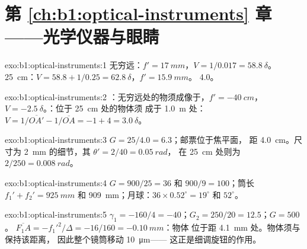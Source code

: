 \section*{第 \ref{ch:b1:optical-instruments} 章——光学仪器与眼睛}

\begin{solution}{exo:b1:optical-instruments:1}
无穷远：$f' = \qty{17}{mm}$，$V = 1/0.017 = \qty{58.8}{\delta}$。
\qty{25}{cm}：$V = 58.8 + 1/0.25 = \qty{62.8}{\delta}$，$f' = \qty{15.9}{mm}$。
 \qty{4.0}{\delta}。
\end{solution}

\begin{solution}{exo:b1:optical-instruments:2}
：无穷远处的物须成像于，$f' = \qty{-40}{cm}$，
$V = \qty{-2.5}{\delta}$。：位于 \qty{25}{cm} 处的物体须
成于 \qty{1.0}{m} 处：$V = 1/\overline{OA'} - 1/\overline{OA}
= -1 + 4 = \qty{+3.0}{\delta}$。
\end{solution}

\begin{solution}{exo:b1:optical-instruments:3}
$G = 25/4.0 = 6.3$；邮票位于焦平面，
距 \qty{4.0}{cm}。尺寸为 \qty{2}{mm} 的细节，其 $\theta' = 2/40 = \qty{0.05}{rad}$，
在 \qty{25}{cm} 处则为 $2/250 = \qty{0.008}{rad}$。
\end{solution}

\begin{solution}{exo:b1:optical-instruments:4}
$G = 900/25 = 36$ 和 $900/9 = 100$；筒长 $f_1' + f_2' =
\qty{925}{mm}$ 和 \qty{909}{mm}；月球：$36 \times 0.52^\circ = 19^\circ$ 和
$52^\circ$。
\end{solution}

\begin{solution}{exo:b1:optical-instruments:5}
$\gamma_1 = -160/4 = -40$；$G_2 = 250/20 = 12.5$；$G = 500$。
$\overline{F_1A} = -f_1'^2/\Delta = -16/160 = \qty{-0.10}{mm}$：物体
位于距 \qty{4.1}{mm} 处。物体须与保持该距离，
因此整个镜筒移动 \qty{10}{\micro m}——
这正是细调旋钮的作用。
\end{solution}

